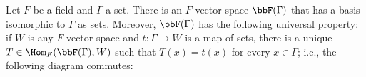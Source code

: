     \begin{theorem}\label{thm:free-vectorspace}
        Let $F$ be a field and $\Gamma$ a set. There is an $F$-vector space $\bbF(\Gamma)$ that has a basis isomorphic to $\Gamma$ as sets. Moreover, $\bbF(\Gamma)$ has the following universal property: if $W$ is any $F$-vector space and $t:\Gamma \rightarrow W$ is a map of sets, there is a unique $T \in \Hom_F(\bbF(\Gamma),W)$ such that $T(x) = t(x)$ for every $x \in \Gamma$; i.e., the following diagram commutes:
            \begin{center}
            \end{center}
    \end{theorem}
